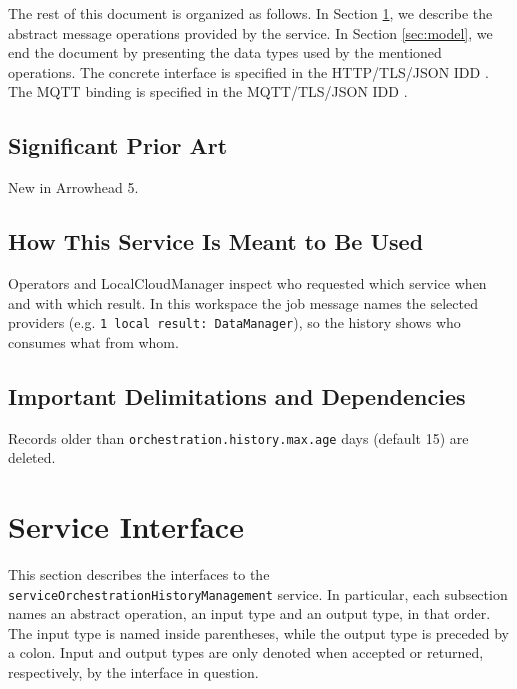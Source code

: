 \documentclass[a4paper]{arrowhead}
\begin{document}
The rest of this document is organized as follows.
In Section \ref{sec:operations}, we describe the abstract message operations provided by the service.
In Section \ref{sec:model}, we end the document by presenting the data types used by the mentioned operations.
The concrete interface is specified in the HTTP/TLS/JSON IDD \cite{ssso-serviceOrchestrationHistoryManagement-http-idd}. The MQTT binding is specified in the MQTT/TLS/JSON IDD \cite{ssso-serviceOrchestrationHistoryManagement-mqtt-idd}.

\subsection{Significant Prior Art}

New in Arrowhead 5.

\subsection{How This Service Is Meant to Be Used}

Operators and LocalCloudManager inspect who requested which service when and with which result. In this workspace the job message names the selected providers (e.g. \texttt{1 local result: Data\allowbreak{}Manager}), so the history shows who consumes what from whom.

\subsection{Important Delimitations and Dependencies}
\label{sec:delimitations}

Records older than \texttt{orchestration.\allowbreak{}history.\allowbreak{}max.\allowbreak{}age} days (default 15) are deleted.

\newpage

\section{Service Interface}
\label{sec:operations}

This section describes the interfaces to the \texttt{service\allowbreak{}Orchestration\allowbreak{}History\allowbreak{}Management} service.
In particular, each subsection names an abstract operation, an input type and an output type, in that order.
The input type is named inside parentheses, while the output type is preceded by a colon.
Input and output types are only denoted when accepted or returned, respectively, by the interface in question.
\end{document}
